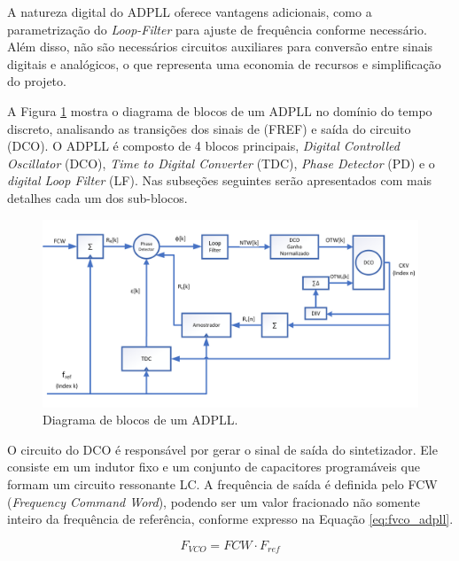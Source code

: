 A natureza digital do ADPLL oferece vantagens adicionais, como a parametrização do \textit{Loop-Filter} para ajuste de frequência conforme necessário. Além disso, não são necessários circuitos auxiliares para conversão entre sinais digitais e analógicos, o que representa uma economia de recursos e simplificação do projeto.

A Figura \ref{fig:adpll_block_diagram} mostra o diagrama de blocos de um ADPLL no domínio do tempo discreto, analisando as transições dos sinais de (FREF) e saída do circuito (DCO). O ADPLL é composto de 4 blocos principais,  \textit{Digital Controlled Oscillator} (DCO), \textit{Time to Digital Converter} (TDC), \textit{Phase Detector} (PD) e o \textit{ digital Loop Filter} (LF). Nas subseções seguintes serão apresentados com mais detalhes cada um dos sub-blocos. 

\begin{figure}[h!]
	\caption{Diagrama de blocos de um ADPLL.}
	\begin{center}
		\includegraphics[scale=1.3]{img/blocos_ADPLL.png}
	\end{center}
	\label{fig:adpll_block_diagram}
\end{figure}

O circuito do DCO é responsável por gerar o sinal de saída do sintetizador. Ele consiste em um indutor fixo e um conjunto de capacitores programáveis que formam um circuito ressonante LC. A frequência de saída é definida pelo FCW (\textit{Frequency Command Word}), podendo ser um valor fracionado não somente inteiro da frequência de referência, conforme expresso na Equação \ref{eq:fvco_adpll}.

\begin{equation}
	F_{VCO} = FCW \cdot F_{ref}
	\label{eq:fvco_adpll}
\end{equation}

